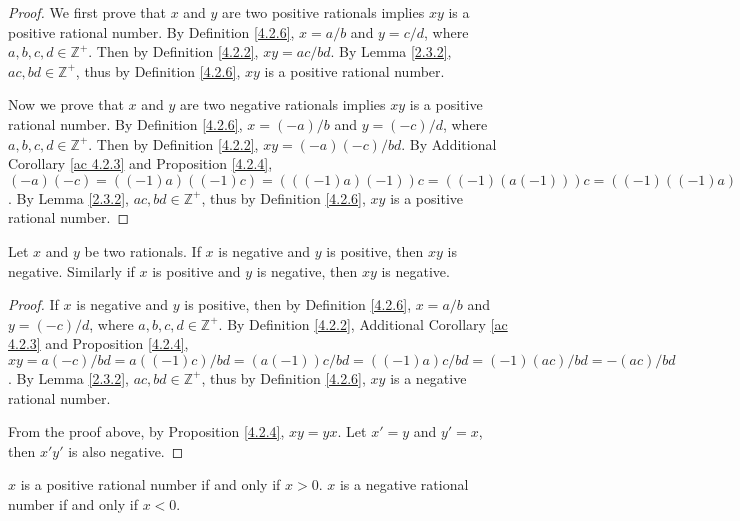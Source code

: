 \begin{proof}
We first prove that \(x\) and \(y\) are two positive rationals implies \(xy\) is a positive rational number.
By Definition \ref{4.2.6}, \(x = a / b\) and \(y = c / d\), where \(a, b, c, d \in \mathds{Z}^+\).
Then by Definition \ref{4.2.2}, \(xy = ac / bd\).
By Lemma \ref{2.3.2}, \(ac, bd \in \mathds{Z}^+\), thus by Definition \ref{4.2.6}, \(xy\) is a positive rational number.

Now we prove that \(x\) and \(y\) are two negative rationals implies \(xy\) is a positive rational number.
By Definition \ref{4.2.6}, \(x = (-a) / b\) and \(y = (-c) / d\), where \(a, b, c, d \in \mathds{Z}^+\).
Then by Definition \ref{4.2.2}, \(xy = (-a)(-c) / bd\).
By Additional Corollary \ref{ac 4.2.3} and Proposition \ref{4.2.4}, \((-a)(-c) = ((-1)a)((-1)c) = (((-1)a)(-1))c = ((-1)(a(-1)))c = ((-1)((-1)a))c = (((-1)(-1))a)c = (1a)c = ac\).
By Lemma \ref{2.3.2}, \(ac, bd \in \mathds{Z}^+\), thus by Definition \ref{4.2.6}, \(xy\) is a positive rational number.
\end{proof}

\begin{additional corollary}\label{ac 4.2.6}
Let \(x\) and \(y\) be two rationals.
If \(x\) is negative and \(y\) is positive, then \(xy\) is negative.
Similarly if \(x\) is positive and \(y\) is negative, then \(xy\) is negative.
\end{additional corollary}

\begin{proof}
If \(x\) is negative and \(y\) is positive, then by Definition \ref{4.2.6}, \(x = a / b\) and \(y = (-c) / d\), where \(a, b, c, d \in \mathds{Z}^+\).
By Definition \ref{4.2.2}, Additional Corollary \ref{ac 4.2.3} and Proposition \ref{4.2.4}, \(xy = a(-c) / bd = a((-1)c) / bd = (a(-1))c / bd = ((-1)a)c / bd = (-1)(ac) / bd = -(ac) / bd\).
By Lemma \ref{2.3.2}, \(ac, bd \in \mathds{Z}^+\), thus by Definition \ref{4.2.6}, \(xy\) is a negative rational number.

From the proof above, by Proposition \ref{4.2.4}, \(xy = yx\).
Let \(x' = y\) and \(y' = x\), then \(x'y'\) is also negative.
\end{proof}

\begin{additional corollary}\label{ac 4.2.7}
\(x\) is a positive rational number if and only if \(x > 0\).
\(x\) is a negative rational number if and only if \(x < 0\).
\end{additional corollary}

